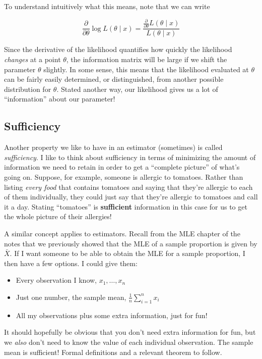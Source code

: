 \documentclass[
  letterpaper,
  DIV=11,
  numbers=noendperiod]{scrreprt}
\providecommand{\tightlist}{%
  \setlength{\itemsep}{0pt}\setlength{\parskip}{0pt}}\usepackage{longtable,booktabs,array}
\begin{document}
To understand intuitively what this means, note that we can write

\[
\frac{\partial}{\partial \theta} \log L(\theta \mid x) = \frac{\frac{\partial}{\partial \theta} L(\theta \mid x)}{L(\theta \mid x)}
\]

Since the derivative of the likelihood quantifies how quickly the
likelihood \emph{changes} at a point \(\theta\), the information matrix
will be large if we shift the parameter \(\theta\) slightly. In some
sense, this means that the likelihood evaluated at \(\theta\) can be
fairly easily determined, or distinguished, from another possible
distribution for \(\theta\). Stated another way, our likelihood gives us
a lot of ``information'' about our parameter!

\subsection*{Sufficiency}\label{sufficiency}

Another property we like to have in an estimator (sometimes) is called
\emph{sufficiency}. I like to think about sufficiency in terms of
minimizing the amount of information we need to retain in order to get a
``complete picture'' of what's going on. Suppose, for example, someone
is allergic to tomatoes. Rather than listing \emph{every food} that
contains tomatoes and saying that they're allergic to each of them
individually, they could just say that they're allergic to tomatoes and
call it a day. Stating ``tomatoes'' is \textbf{sufficient} information
in this case for us to get the whole picture of their allergies!

A similar concept applies to estimators. Recall from the MLE chapter of
the notes that we previously showed that the MLE of a sample proportion
is given by \(\bar{X}\). If I want someone to be able to obtain the MLE
for a sample proportion, I then have a few options. I could give them:

\begin{itemize}
\tightlist
\item
  Every observation I know, \(x_1, \dots,x_n\)
\item
  Just one number, the sample mean, \(\frac{1}{n}\sum_{i = 1}^n x_i\)
\item
  All my observations plus some extra information, just for fun!
\end{itemize}

It should hopefully be obvious that you don't need extra information for
fun, but we \emph{also} don't need to know the value of each individual
observation. The sample mean is sufficient! Formal definitions and a
relevant theorem to follow.
\end{document}
